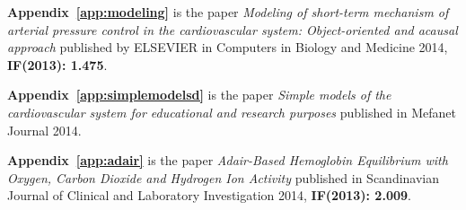 \textbf{Appendix~\ref{app:modeling}} is the paper \cite{Kulhanek2014Modeling} \emph{Modeling of short-term mechanism of arterial pressure control in the cardiovascular system: Object-oriented and acausal approach} published by ELSEVIER in Computers in Biology and Medicine 2014, \textbf{IF(2013): 1.475}.

\textbf{Appendix~\ref{app:simplemodelsd}} is the paper \cite{Kulhanek2014mefanet} \emph{Simple models of the cardiovascular system for educational and research purposes} published in Mefanet Journal 2014.

\textbf{Appendix~\ref{app:adair}} is the paper \cite{Matejak2014sj} \emph{Adair-Based Hemoglobin Equilibrium with Oxygen, Carbon Dioxide and Hydrogen Ion Activity} published in Scandinavian Journal of Clinical and Laboratory Investigation 2014, \textbf{IF(2013): 2.009}.

